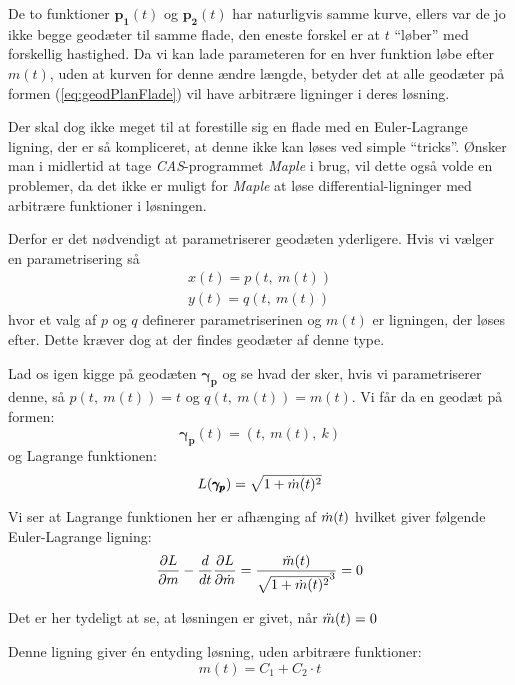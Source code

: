 De to funktioner \(\pmb{p_1}(t)\) og \(\pmb{p_2}(t)\) har naturligvis samme kurve,
ellers var de jo ikke begge geodæter til samme flade, den eneste forskel er at \(t\) ``løber'' med forskellig hastighed.
Da vi kan lade parameteren for en hver funktion løbe efter \(m(t)\), uden at kurven for denne ændre længde,
betyder det at alle geodæter på formen (\ref{eq:geodPlanFlade}) vil have arbitrære ligninger i deres løsning.

Der skal dog ikke meget til at forestille sig en flade med en Euler-Lagrange ligning, der er så kompliceret,
at denne ikke kan løses ved simple ``tricks''. Ønsker man i midlertid at tage \emph{CAS}-programmet \emph{Maple}
i brug, vil dette også volde en problemer,
da det ikke er muligt for \emph{Maple} at løse differential-ligninger med arbitrære funktioner i løsningen.

Derfor er det nødvendigt at parametriserer geodæten yderligere. Hvis vi vælger en parametrisering så
\begin{gather*}
x(t) = p(t,~m(t))\\
y(t) = q(t,~m(t))
\end{gather*}
hvor et valg af \(p\) og \(q\) definerer parametriserinen og \(m(t)\) er ligningen, der løses efter.
Dette kræver dog at der findes geodæter af denne type.

Lad os igen kigge på geodæten \(\pmb{\gamma_p}\) og se hvad der sker, hvis vi parametriserer denne,
så \(p(t,~m(t) ) = t\) og \(q(t,~m(t) ) = m(t)\).
Vi får da en geodæt på formen:
\begin{equation*}
\pmb{\gamma_p}(t) = (t,~m(t),~k)
\end{equation*}
%
og Lagrange funktionen:
\begin{equation*}
L(\pmb{\gamma_p}) = \sqrt{ 1 + \dot{m}(t)^2 }
\end{equation*}

Vi ser at Lagrange funktionen her er afhænging af \(\dot{m}(t)\) 
hvilket giver følgende Euler-Lagrange ligning:
\begin{equation*}
\frac{\partial L}{\partial m} - \frac{d}{d t} \frac{\partial L}{\partial \dot{m}} = 
\frac{\ddot{m}(t)}{\sqrt{1 + \dot{m}(t)^2}^3} = 0\\
\end{equation*}

Det er her tydeligt at se, at løsningen er givet, når \(\ddot{m}(t) = 0\)

Denne ligning giver én entyding løsning, uden arbitrære funktioner:
\begin{equation*}
m(t) = C_1 + C_2 \cdot t
\end{equation*}

